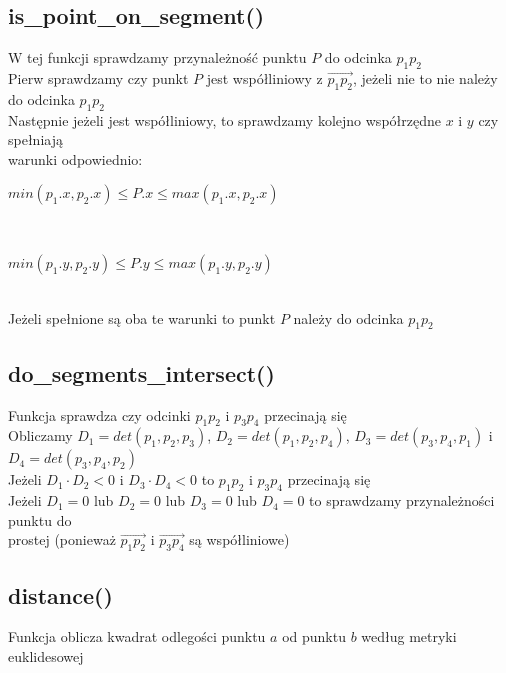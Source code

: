 \documentclass{article}
\begin{document}
\subsection{is\_point\_on\_segment()}
W tej funkcji sprawdzamy przynależność punktu $P$ do odcinka $p_1p_2$ \\ Pierw sprawdzamy czy punkt $P$ jest współliniowy z $\overrightarrow{p_1p_2}$, jeżeli nie to nie należy do odcinka $p_1p_2$ \\ Następnie jeżeli jest współliniowy, to sprawdzamy kolejno współrzędne $x$ i $y$ czy spełniają \\ warunki odpowiednio: \\ \centerline{$min(p_1.x, p_2.x) \leq P.x \leq max(p_1.x, p_2.x)$} \\ \centerline{$min(p_1.y, p_2.y) \leq P.y \leq max(p_1.y, p_2.y)$}\\ Jeżeli spełnione są oba te warunki to punkt $P$ należy do odcinka $p_1p_2$


\subsection{do\_segments\_intersect()}
Funkcja sprawdza czy odcinki $p_1p_2$ i $p_3p_4$ przecinają się \\ Obliczamy $D_1 = det(p_1, p_2, p_3)$, $D_2 = det(p_1, p_2, p_4)$, $D_3 = det(p_3, p_4, p_1)$ i $D_4 = det(p_3, p_4, p_2)$ \\ Jeżeli $D_1 \cdot D_2 < 0$ i $D_3 \cdot D_4 < 0$ to $p_1p_2$ i $p_3p_4$ przecinają się \\ Jeżeli $D_1 = 0$ lub $D_2 = 0$ lub $D_3 =0$ lub $D_4 = 0$ to sprawdzamy przynależności punktu do \\ prostej (ponieważ $\overrightarrow{p_1p_2}$ i $\overrightarrow{p_3p_4}$ są współliniowe)


\subsection{distance()}
Funkcja oblicza kwadrat odlegości punktu $a$ od punktu $b$ według metryki euklidesowej

\end{document}
